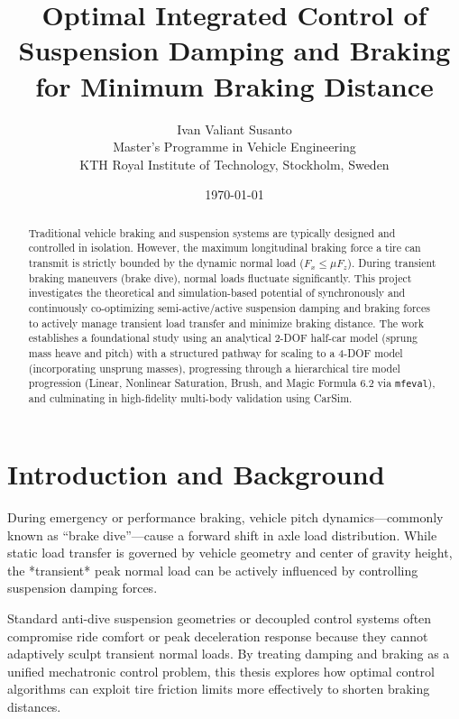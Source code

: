 \documentclass[11pt,a4paper]{article}
\title{\textbf{Optimal Integrated Control of Suspension Damping and Braking for Minimum Braking Distance}}
\author{Ivan Valiant Susanto \\ 
\small Master's Programme in Vehicle Engineering \\ 
\small KTH Royal Institute of Technology, Stockholm, Sweden}
\date{\today}
\begin{document}
\maketitle

\begin{abstract}
Traditional vehicle braking and suspension systems are typically designed and controlled in isolation. However, the maximum longitudinal braking force a tire can transmit is strictly bounded by the dynamic normal load ($F_x \le \mu F_z$). During transient braking maneuvers (brake dive), normal loads fluctuate significantly. This project investigates the theoretical and simulation-based potential of synchronously and continuously co-optimizing semi-active/active suspension damping and braking forces to actively manage transient load transfer and minimize braking distance. The work establishes a foundational study using an analytical 2-DOF half-car model (sprung mass heave and pitch) with a structured pathway for scaling to a 4-DOF model (incorporating unsprung masses), progressing through a hierarchical tire model progression (Linear, Nonlinear Saturation, Brush, and Magic Formula 6.2 via \texttt{mfeval}), and culminating in high-fidelity multi-body validation using CarSim.
\end{abstract}

\section{Introduction and Background}
During emergency or performance braking, vehicle pitch dynamics—commonly known as ``brake dive''—cause a forward shift in axle load distribution. While static load transfer is governed by vehicle geometry and center of gravity height, the *transient* peak normal load can be actively influenced by controlling suspension damping forces. 

Standard anti-dive suspension geometries or decoupled control systems often compromise ride comfort or peak deceleration response because they cannot adaptively sculpt transient normal loads. By treating damping and braking as a unified mechatronic control problem, this thesis explores how optimal control algorithms can exploit tire friction limits more effectively to shorten braking distances.
\end{document}

